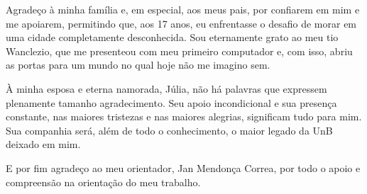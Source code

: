 Agradeço à minha família e, em especial, aos meus pais, por confiarem em mim e me apoiarem, permitindo que, aos 17 anos, eu enfrentasse o desafio de morar em uma cidade completamente desconhecida.
Sou eternamente grato ao meu tio Wanclezio, que me presenteou com meu primeiro computador e, com isso, abriu as portas para um mundo no qual hoje não me imagino sem.

À minha esposa e eterna namorada, Júlia, não há palavras que expressem plenamente tamanho agradecimento. Seu apoio incondicional e sua presença constante, nas maiores tristezas e nas maiores alegrias, significam tudo para mim. Sua companhia será, além de todo o conhecimento, o maior legado da UnB deixado em mim.

E por fim agradeço ao meu orientador, Jan Mendonça Correa, por todo o apoio e compreensão na orientação do meu trabalho.


